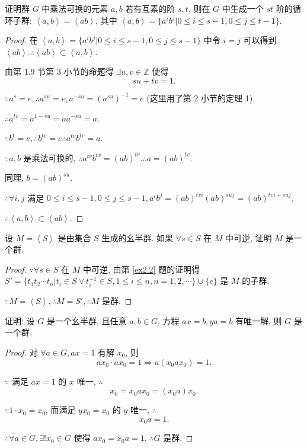 \documentclass{ctexart}
\begin{document}
\begin{exercise}[2.3]
    证明群 $G$ 中乘法可换的元素 $a,b$ 若有互素的阶 $s,t$, 则在 $G$ 中生成一个 $st$ 阶的循环子群: $\left<a,b\right>=\left<ab\right>$, 其中 $\left<a,b\right>=\{a^ib^j|0\leq i\leq s-1,0\leq j\leq t-1\}$.
\end{exercise}
\begin{proof}
    在 $\left<a,b\right>=\{a^ib^j|0\leq i\leq s-1,0\leq j\leq s-1\}$ 中令 $i=j$ 可以得到 $\left<ab\right>.\therefore\left<ab\right>\subset\left<a,b\right>$.

    由第 1.9 节第 3 小节的命题得 $\exists u,v\in\mathbb{Z}$ 使得
    \[su+tv=1.\]

    $\because a^s=e,\therefore a^{su}=e,a^{-su}=(a^{su})^{-1}=e$ (这里用了第 2 小节的定理 1).

    $\therefore a^{tv}=a^{1-su}=aa^{-su}=a$.

    $\because b^t=e,\therefore b^{tv}=e\therefore a^{tv}b^{tv}=a$.

    $\because a,b$ 是乘法可换的, $\therefore a^{tv}b^{tv}=(ab)^{tv}.\therefore a=(ab)^{tv}$.

    同理, $b=(ab)^{su}$.

    $\therefore\forall i,j$ 满足 $0\leq i\leq s-1,0\leq j\leq s-1,a^ib^j=(ab)^{tvi}(ab)^{suj}=(ab)^{tvi+suj}$.

    $\therefore\left<a,b\right>\subset\left<ab\right>$.
\end{proof}
\begin{exercise}[2.4]
    设 $M=\left<S\right>$ 是由集合 $S$ 生成的幺半群. 如果 $\forall s\in S$ 在 $M$ 中可逆, 证明 $M$ 是一个群.
\end{exercise}
\begin{proof}
    $\because\forall s\in S$ 在 $M$ 中可逆, 由第 \ref{ex2.2} 题的证明得 $S'=\{t_1t_2\cdots t_n|t_i\in S\vee t_i^{-1}\in S,1\leq i\leq n,n=1,2,\cdots\}\cup\{e\}$ 是 $M$ 的子群.

    $\because M=\left<S\right>,\therefore M=S',\therefore M$ 是群.
\end{proof}
\begin{exercise}[2.5]
    证明: 设 $G$ 是一个幺半群, 且任意 $a,b\in G$, 方程 $ax=b,ya=b$ 有唯一解, 则 $G$ 是一个群.
\end{exercise}
\begin{proof}
    对 $\forall a\in G,ax=1$ 有解 $x_0$, 则
    \[ax_0\cdot ax_0=1\Rightarrow a(x_0ax_0)=1.\]

    $\because$ 满足 $ax=1$ 的 $x$ 唯一, $\therefore$
    \[x_0=x_0ax_0=(x_0a)x_0.\]

    $\because1\cdot x_0=x_0$, 而满足 $yx_0=x_0$ 的 $y$ 唯一, $\therefore$
    \[x_0a=1.\]

    $\therefore\forall a\in G,\exists!x_0\in G$ 使得 $ax_0=x_0a=1$. $\therefore G$ 是群.
\end{proof}
\end{document}
